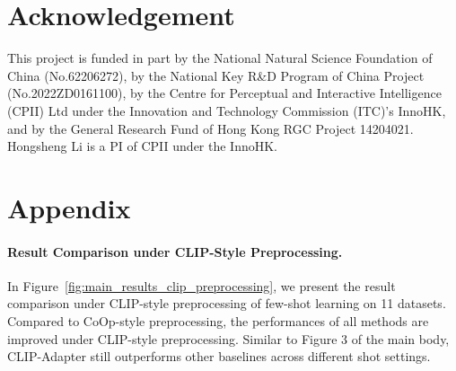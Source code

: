 \documentclass[default,iicol]{sn-jnl}%
\theoremstyle{thmstyleone}%
\theoremstyle{thmstyletwo}%
\theoremstyle{thmstylethree}%
\begin{document}
\section*{Acknowledgement}
This project is funded in part by the National Natural Science Foundation of China (No.62206272), by the National Key R\&D Program of China Project (No.2022ZD0161100), by the Centre for Perceptual and Interactive Intelligence (CPII) Ltd under the Innovation and Technology Commission (ITC)’s InnoHK, and by the General Research Fund of Hong Kong RGC Project 14204021. Hongsheng Li is a PI of CPII under the InnoHK.



\clearpage
\appendix

\section{Appendix}
\label{sec:appendix-clip-preprocessing}
\paragraph{Result Comparison under CLIP-Style Preprocessing.}
In Figure~\ref{fig:main_results_clip_preprocessing}, we present the result comparison under CLIP-style preprocessing of few-shot learning on 11 datasets. Compared to CoOp-style preprocessing, the performances of all methods are improved under CLIP-style preprocessing. Similar to Figure 3 of the main body, CLIP-Adapter still outperforms other baselines across different shot settings.



\end{document}
